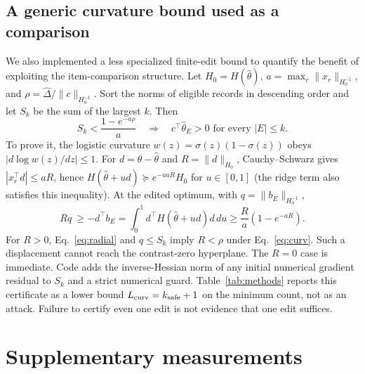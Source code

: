 \documentclass{article}
\begin{document}
\subsection{A generic curvature bound used as a comparison}
\label{app:curvature}
We also implemented a less specialized finite-edit bound to quantify the benefit of exploiting the item-comparison structure. Let $H_0=H(\hat\theta)$, $a=\max_r\|x_r\|_{H_0^{-1}}$, and $\rho=\hat\Delta/\|c\|_{H_0^{-1}}$. Sort the norms of eligible records in descending order and let $S_k$ be the sum of the largest $k$. Then
\begin{equation}
 S_k < \frac{1-e^{-a\rho}}{a}\quad\Longrightarrow\quad
 c^\top\hat\theta_E>0\text{ for every }|E|\le k.\label{eq:curv}
\end{equation}
To prove it, the logistic curvature $w(z)=\sigma(z)(1-\sigma(z))$ obeys $|d\log w(z)/dz|\le1$. For $d=\theta-\hat\theta$ and $R=\|d\|_{H_0}$, Cauchy--Schwarz gives $|x_r^\top d|\le aR$, hence $H(\hat\theta+u d)\succeq e^{-uaR}H_0$ for $u\in[0,1]$ (the ridge term also satisfies this inequality). At the edited optimum, with $q=\|b_E\|_{H_0^{-1}}$,
\begin{equation}
 Rq\ \ge -d^\top b_E
 =\int_0^1d^\top H(\hat\theta+u d)d\,du
 \ge \frac{R}{a}(1-e^{-aR}).\label{eq:radial}
\end{equation}
For $R>0$, Eq.~\eqref{eq:radial} and $q\le S_k$ imply $R<\rho$ under Eq.~\eqref{eq:curv}. Such a displacement cannot reach the contrast-zero hyperplane. The $R=0$ case is immediate. Code adds the inverse-Hessian norm of any initial numerical gradient residual to $S_k$ and a strict numerical guard. Table~\ref{tab:methods} reports this certificate as a lower bound $L_{\rm curv}=k_{\rm safe}+1$ on the minimum count, not as an attack. Failure to certify even one edit is not evidence that one edit suffices.

\section{Supplementary measurements}
\label{app:extra}
\begin{table}[h]
\caption{Constructed leading-pair thresholds and lower bounds. $W_{\ell r}$ is direct-win capacity; $L_{\rm dir}$ is Theorem~\ref{thm:direct}'s necessary count; $L_{\rm curv}$ is the curvature-only necessary count. Adaptive and incident columns are feasible flip constructions. Delete uses its own operation and ordering and has no direct-transfer certificate.}
\label{tab:methods}
\centering\small
\end{table}
\end{document}

